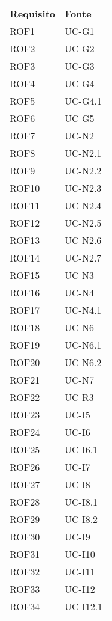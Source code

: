 \newpage
\begin{longtable}{| p{5cm} | p{5cm} |}
		\rowcolor{LightBlue}
		\color{white}\bfseries Requisito & \color{white}\bfseries Fonte \\[0.25cm]
		\rowcolor{LightGray}
		ROF1 & UC-G1\\
		ROF2 & UC-G2\\
		\rowcolor{LightGray}
		ROF3 & UC-G3\\
		ROF4 & UC-G4\\		
		\rowcolor{LightGray}
		ROF5 & UC-G4.1\\
		ROF6 & UC-G5\\
		\rowcolor{LightGray}
		ROF7 & UC-N2\\
		ROF8 & UC-N2.1\\
		\rowcolor{LightGray}
		ROF9 & UC-N2.2\\
		ROF10 & UC-N2.3\\
		\rowcolor{LightGray}
		ROF11 & UC-N2.4\\
		ROF12 & UC-N2.5\\
		\rowcolor{LightGray}
		ROF13 & UC-N2.6\\
		ROF14 & UC-N2.7\\
		\rowcolor{LightGray}
		ROF15 & UC-N3\\
		ROF16 & UC-N4\\
		\rowcolor{LightGray}
		ROF17 & UC-N4.1\\
		ROF18 & UC-N6\\
		\rowcolor{LightGray}
		ROF19 & UC-N6.1\\
		ROF20 & UC-N6.2\\
		\rowcolor{LightGray}
		ROF21 & UC-N7\\
		ROF22 & UC-R3\\	
		\rowcolor{LightGray}
		ROF23 & UC-I5\\
		ROF24 & UC-I6\\
		\rowcolor{LightGray}
		ROF25 & UC-I6.1\\
		ROF26 & UC-I7\\
		\rowcolor{LightGray}
		ROF27 & UC-I8\\
		ROF28 & UC-I8.1\\
		\rowcolor{LightGray}
		ROF29 & UC-I8.2\\
		ROF30 & UC-I9\\
		\rowcolor{LightGray}
		ROF31 & UC-I10\\
		ROF32 & UC-I11\\
		\rowcolor{LightGray}
		ROF33 & UC-I12\\
		ROF34 & UC-I12.1\\

\end{longtable}

